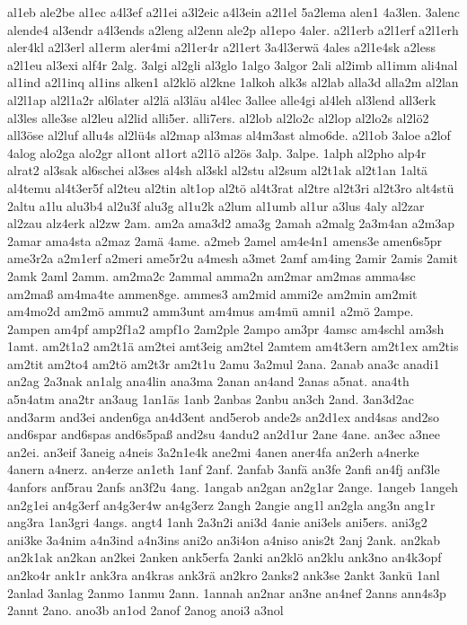 {al1eb
ale2be
al1ec
a4l3ef
a2l1ei
a3l2eic
a4l3ein
a2l1el
5a2lema
alen1
4a3len.
3alenc
alende4
al3endr
a4l3ends
a2leng
al2enn
ale2p
al1epo
4aler.
a2l1erb
a2l1erf
a2l1erh
aler4kl
a2l3erl
al1erm
aler4mi
a2l1er4r
a2l1ert
3a4l3erwä
4ales
a2l1e4sk
a2less
a2l1eu
al3exi
alf4r
2alg.
3algi
al2gli
al3glo
1algo
3algor
2ali
al2imb
al1imm
ali4nal
al1ind
a2l1inq
al1ins
alken1
al2klö
al2kne
1alkoh
alk3s
al2lab
alla3d
alla2m
al2lan
al2l1ap
al2l1a2r
al6later
al2lä
al3läu
al4lec
3allee
alle4gi
al4leh
al3lend
all3erk
al3les
alle3se
al2leu
al2lid
alli5er.
alli7ers.
al2lob
al2lo2c
al2lop
al2lo2s
al2lö2
all3öse
al2luf
allu4s
al2lü4s
al2map
al3mas
al4m3ast
almo6de.
a2l1ob
3aloe
a2lof
4alog
alo2ga
alo2gr
al1ont
al1ort
a2l1ö
al2ös
3alp.
3alpe.
1alph
al2pho
alp4r
alrat2
al3sak
al6schei
al3ses
al4sh
al3skl
al2stu
al2sum
al2t1ak
al2t1an
1altä
al4temu
al4t3er5f
al2teu
al2tin
alt1op
al2tö
al4t3rat
al2tre
al2t3ri
al2t3ro
alt4stü
2altu
a1lu
alu3b4
al2u3f
alu3g
al1u2k
a2lum
al1umb
al1ur
a3lus
4aly
al2zar
al2zau
alz4erk
al2zw
2am.
am2a
ama3d2
ama3g
2amah
a2malg
2a3m4an
a2m3ap
2amar
ama4sta
a2maz
2amä
4ame.
a2meb
2amel
am4e4n1
amens3e
amen6s5pr
ame3r2a
a2m1erf
a2meri
ame5r2u
a4mesh
a3met
2amf
am4ing
2amir
2amis
2amit
2amk
2aml
2amm.
am2ma2c
2ammal
amma2n
am2mar
am2mas
amma4sc
am2maß
am4ma4te
ammen8ge.
ammes3
am2mid
ammi2e
am2min
am2mit
am4mo2d
am2mö
ammu2
amm3unt
am4mus
am4mü
amni1
a2mö
2ampe.
2ampen
am4pf
amp2f1a2
ampf1o
2am2ple
2ampo
am3pr
4amsc
am4schl
am3sh
1amt.
am2t1a2
am2t1ä
am2tei
amt3eig
am2tel
2amtem
am4t3ern
am2t1ex
am2tis
am2tit
am2to4
am2tö
am2t3r
am2t1u
2amu
3a2mul
2ana.
2anab
ana3c
anadi1
an2ag
2a3nak
an1alg
ana4lin
ana3ma
2anan
an4and
2anas
a5nat.
ana4th
a5n4atm
ana2tr
an3aug
1an1äs
1anb
2anbas
2anbu
an3ch
2and.
3an3d2ac
and3arm
and3ei
anden6ga
an4d3ent
and5erob
ande2s
an2d1ex
and4sas
and2so
and6spar
and6spas
and6s5paß
and2su
4andu2
an2d1ur
2ane
4ane.
an3ec
a3nee
an2ei.
an3eif
3aneig
a4neis
3a2n1e4k
ane2mi
4anen
aner4fa
an2erh
a4nerke
4anern
a4nerz.
an4erze
an1eth
1anf
2anf.
2anfab
3anfä
an3fe
2anfi
an4fj
anf3le
4anfors
anf5rau
2anfs
an3f2u
4ang.
1angab
an2gan
an2g1ar
2ange.
1angeb
1angeh
an2g1ei
an4g3erf
an4g3er4w
an4g3erz
2angh
2angie
ang1l
an2gla
ang3n
ang1r
ang3ra
1an3gri
4angs.
angt4
1anh
2a3n2i
ani3d
4anie
ani3els
ani5ers.
ani3g2
ani3ke
3a4nim
a4n3ind
a4n3ins
ani2o
an3i4on
a4niso
anis2t
2anj
2ank.
an2kab
an2k1ak
an2kan
an2kei
2anken
ank5erfa
2anki
an2klö
an2klu
ank3no
an4k3opf
an2ko4r
ank1r
ank3ra
an4kras
ank3rä
an2kro
2anks2
ank3se
2ankt
3ankü
1anl
2anlad
3anlag
2anmo
1anmu
2ann.
1annah
an2nar
an3ne
an4nef
2anns
ann4s3p
2annt
2ano.
ano3b
an1od
2anof
2anog
anoi3
a3nol
}
